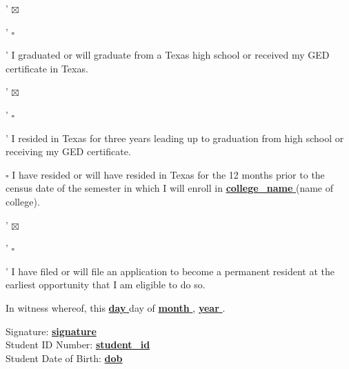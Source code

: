 \documentclass[12pt]{article}
\begin{document}
{{ '%
$\boxtimes$
{{ '%
$\square$
{{ '%
I graduated or will graduate from a Texas high school or received my GED certificate in Texas.

\vspace{0.5em}
{{ '%
$\boxtimes$
{{ '%
$\square$
{{ '%
I resided in Texas for three years leading up to graduation from high school or receiving my GED certificate.

\vspace{0.5em}
$\square$ I have resided or will have resided in Texas for the 12 months prior to the census date of the semester in which I will enroll in \underline{\textbf{{{{ college_name }}}}} (name of college).

\vspace{0.5em}
{{ '%
$\boxtimes$
{{ '%
$\square$
{{ '%
I have filed or will file an application to become a permanent resident at the earliest opportunity that I am eligible to do so.

\vspace{1em}

In witness whereof, this \underline{\textbf{{{{ day }}}}} day of
\underline{\textbf{{{{ month }}}}}, \underline{\textbf{{{{ year }}}}}.

\vspace{1em}

Signature: \underline{\textbf{{{{ signature }}}}} \\
Student ID Number: \underline{\textbf{{{{ student_id }}}}} \\
Student Date of Birth: \underline{\textbf{{{{ dob }}}}}

\vspace{2em}

\begin{center}
\end{center}}}}}}}}}}}}}}}}}}}
\end{document}
